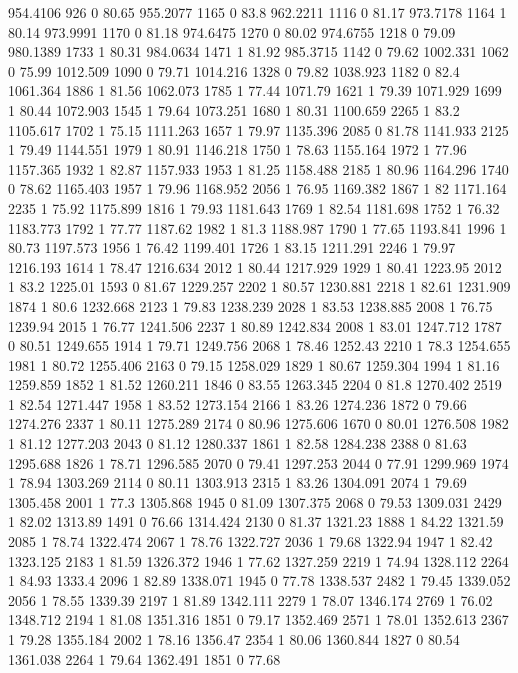 954.4106	926	0	80.65
955.2077	1165	0	83.8
962.2211	1116	0	81.17
973.7178	1164	1	80.14
973.9991	1170	0	81.18
974.6475	1270	0	80.02
974.6755	1218	0	79.09
980.1389	1733	1	80.31
984.0634	1471	1	81.92
985.3715	1142	0	79.62
1002.331	1062	0	75.99
1012.509	1090	0	79.71
1014.216	1328	0	79.82
1038.923	1182	0	82.4
1061.364	1886	1	81.56
1062.073	1785	1	77.44
1071.79	1621	1	79.39
1071.929	1699	1	80.44
1072.903	1545	1	79.64
1073.251	1680	1	80.31
1100.659	2265	1	83.2
1105.617	1702	1	75.15
1111.263	1657	1	79.97
1135.396	2085	0	81.78
1141.933	2125	1	79.49
1144.551	1979	1	80.91
1146.218	1750	1	78.63
1155.164	1972	1	77.96
1157.365	1932	1	82.87
1157.933	1953	1	81.25
1158.488	2185	1	80.96
1164.296	1740	0	78.62
1165.403	1957	1	79.96
1168.952	2056	1	76.95
1169.382	1867	1	82
1171.164	2235	1	75.92
1175.899	1816	1	79.93
1181.643	1769	1	82.54
1181.698	1752	1	76.32
1183.773	1792	1	77.77
1187.62	1982	1	81.3
1188.987	1790	1	77.65
1193.841	1996	1	80.73
1197.573	1956	1	76.42
1199.401	1726	1	83.15
1211.291	2246	1	79.97
1216.193	1614	1	78.47
1216.634	2012	1	80.44
1217.929	1929	1	80.41
1223.95	2012	1	83.2
1225.01	1593	0	81.67
1229.257	2202	1	80.57
1230.881	2218	1	82.61
1231.909	1874	1	80.6
1232.668	2123	1	79.83
1238.239	2028	1	83.53
1238.885	2008	1	76.75
1239.94	2015	1	76.77
1241.506	2237	1	80.89
1242.834	2008	1	83.01
1247.712	1787	0	80.51
1249.655	1914	1	79.71
1249.756	2068	1	78.46
1252.43	2210	1	78.3
1254.655	1981	1	80.72
1255.406	2163	0	79.15
1258.029	1829	1	80.67
1259.304	1994	1	81.16
1259.859	1852	1	81.52
1260.211	1846	0	83.55
1263.345	2204	0	81.8
1270.402	2519	1	82.54
1271.447	1958	1	83.52
1273.154	2166	1	83.26
1274.236	1872	0	79.66
1274.276	2337	1	80.11
1275.289	2174	0	80.96
1275.606	1670	0	80.01
1276.508	1982	1	81.12
1277.203	2043	0	81.12
1280.337	1861	1	82.58
1284.238	2388	0	81.63
1295.688	1826	1	78.71
1296.585	2070	0	79.41
1297.253	2044	0	77.91
1299.969	1974	1	78.94
1303.269	2114	0	80.11
1303.913	2315	1	83.26
1304.091	2074	1	79.69
1305.458	2001	1	77.3
1305.868	1945	0	81.09
1307.375	2068	0	79.53
1309.031	2429	1	82.02
1313.89	1491	0	76.66
1314.424	2130	0	81.37
1321.23	1888	1	84.22
1321.59	2085	1	78.74
1322.474	2067	1	78.76
1322.727	2036	1	79.68
1322.94	1947	1	82.42
1323.125	2183	1	81.59
1326.372	1946	1	77.62
1327.259	2219	1	74.94
1328.112	2264	1	84.93
1333.4	2096	1	82.89
1338.071	1945	0	77.78
1338.537	2482	1	79.45
1339.052	2056	1	78.55
1339.39	2197	1	81.89
1342.111	2279	1	78.07
1346.174	2769	1	76.02
1348.712	2194	1	81.08
1351.316	1851	0	79.17
1352.469	2571	1	78.01
1352.613	2367	1	79.28
1355.184	2002	1	78.16
1356.47	2354	1	80.06
1360.844	1827	0	80.54
1361.038	2264	1	79.64
1362.491	1851	0	77.68
